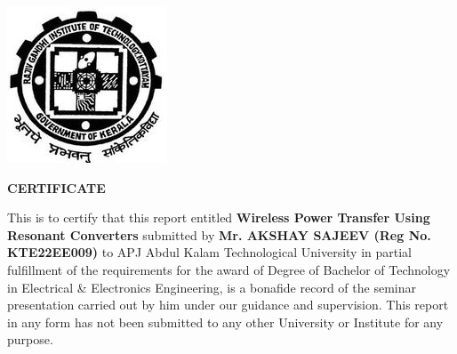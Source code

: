 \documentclass[12pt,a4paper]{report}
\begin{document}
\begin{center}

\includegraphics[scale=0.6]{imagerit.png}

 

\end{center}

\begin{center}

\textbf{\large CERTIFICATE}

\end{center}

 This is to certify that this report entitled \textbf{ \small  Wireless Power Transfer Using Resonant Converters } submitted by \textbf{Mr. AKSHAY SAJEEV (Reg No. KTE22EE009)} to APJ Abdul Kalam Technological University in partial fulfillment of the requirements for the award of Degree of Bachelor of Technology in Electrical \& Electronics Engineering, is a bonafide record of the seminar presentation carried out by him under our guidance and supervision. This report in any form has not been submitted to any other University or Institute for any purpose.

\vspace{1cm}
\end{document}
